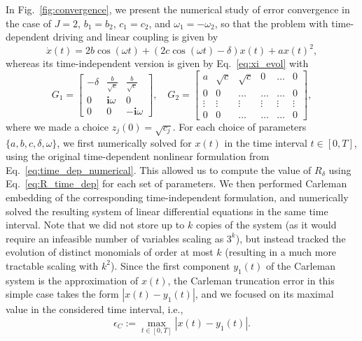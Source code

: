 \documentclass[superscriptaddress,onecolumn,nofootinbib,longbibliography,a4paper,accepted=2026-09-29]{quantumarticle}
\theoremstyle{plain}
\theoremstyle{definition}
\numberwithin{thm}{section}
\numberwithin{assumption}{section}
\numberwithin{lemma}{section}
\numberwithin{prop}{section}
\numberwithin{cor}{section}
\numberwithin{definition}{section}
\numberwithin{rmk}{section}
\numberwithin{equation}{section}
\renewcommand{\i}{\ensuremath{\mathbf{i}}}
\begin{document}
In Fig.~\ref{fig:convergence}, we present the numerical study of error convergence in the case of $J=2$, $b_1=b_2$, $c_1=c_2$, and $\omega_1=-\omega_2$, so that the problem with time-dependent driving and linear coupling is given by
\begin{equation}
    \label{eq:time_dep_numerical}
    \dot{x}(t) = 2b\cos(\omega t) +\left(2c\cos(\omega t)-\delta\right) x(t) + a x(t)^2,
\end{equation}
whereas its time-independent version is given by Eq.~\eqref{eq:xi_evol} with 
\begin{equation}
    G_1 = \begin{bmatrix}
        -\delta &\frac{b}{\sqrt{c}} & \frac{b}{\sqrt{c}}\\
        0 & \i\omega & 0 \\
        0 & 0 & -\i\omega 
        \end{bmatrix}\! ,
    \quad
    G_2 = \begin{bmatrix}
        a & \sqrt{c} & \sqrt{c} & 0 &\dots  &  0\\
        0 & 0  & \dots & \dots & \dots &0 \\
        \vdots  & \vdots & \vdots & \vdots & \vdots &\vdots \\
        0 & 0 &  \dots & \dots & \dots &0 
    \end{bmatrix},
\end{equation}
where we made a choice $z_j(0)=\sqrt{c_j}$. For each choice of parameters $\{a,b,c,\delta,\omega\}$, we first numerically solved for $x(t)$ in the time interval $t\in[0,T]$, using the original time-dependent nonlinear formulation from Eq.~\eqref{eq:time_dep_numerical}. This allowed us to compute the value of $R_\delta$ using Eq.~\eqref{eq:R_time_dep} for each set of parameters. We then performed Carleman embedding of the corresponding time-independent formulation, and numerically solved the resulting system of linear differential equations in the same time interval. Note that we did not store up to $k$ copies of the system (as it would require an infeasible number of variables scaling as $3^k$), but instead tracked the evolution of distinct monomials of order at most $k$ (resulting in a much more tractable scaling with $k^2$). Since the first component $y_1(t)$ of the Carleman system is the approximation of $x(t)$, the Carleman truncation error in this simple case takes the form $|x(t)-y_1(t)|$, and we focused on its maximal value in the considered time interval, i.e.,
\begin{equation}
    \epsilon_C := \max_{t\in[0,T]} |x(t)-y_1(t)|.
\end{equation}
\end{document}
